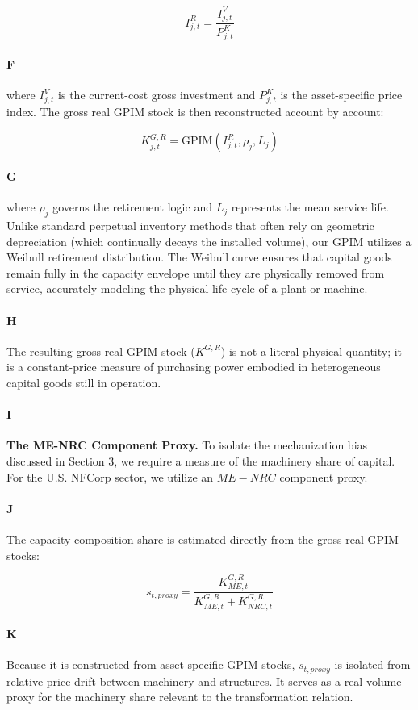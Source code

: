 \[ I_{j,t}^R = \frac{I_{j,t}^V}{P_{j,t}^K} \]

\paragraph{F}
where $I_{j,t}^V$ is the current-cost gross investment and $P_{j,t}^K$ is the asset-specific price index. The gross real GPIM stock is then reconstructed account by account:

\[ K_{j,t}^{G,R} = \text{GPIM}(I_{j,t}^R, \rho_j, L_j) \]

\paragraph{G}
where $\rho_j$ governs the retirement logic and $L_j$ represents the mean service life. Unlike standard perpetual inventory methods that often rely on geometric depreciation (which continually decays the installed volume), our GPIM utilizes a Weibull retirement distribution. The Weibull curve ensures that capital goods remain fully in the capacity envelope until they are physically removed from service, accurately modeling the physical life cycle of a plant or machine.

\paragraph{H}
The resulting gross real GPIM stock ($K^{G,R}$) is not a literal physical quantity; it is a constant-price measure of purchasing power embodied in heterogeneous capital goods still in operation.

\paragraph{I}
\textbf{The ME-NRC Component Proxy.} To isolate the mechanization bias discussed in Section 3, we require a measure of the machinery share of capital. For the U.S. NFCorp sector, we utilize an $ME-NRC$ component proxy.

\paragraph{J}
The capacity-composition share is estimated directly from the gross real GPIM stocks:

\[ s_{t, proxy} = \frac{K_{ME,t}^{G,R}}{K_{ME,t}^{G,R} + K_{NRC,t}^{G,R}} \]

\paragraph{K}
Because it is constructed from asset-specific GPIM stocks, $s_{t, proxy}$ is isolated from relative price drift between machinery and structures. It serves as a real-volume proxy for the machinery share relevant to the transformation relation.

